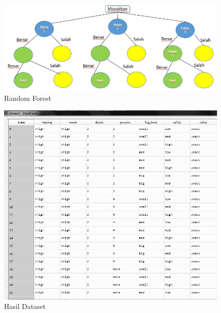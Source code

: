\begin{figure}
	\centerline{\includegraphics[width=1\textwidth]{figures/huda/chapter3/1.JPG}}
	\caption{Random Forest}
	\label{h1}
\end{figure}

\begin{figure}
	\centerline{\includegraphics[width=1\textwidth]{figures/huda/chapter3/2.PNG}}
	\caption{Hasil Dataset}
	\label{h2}
\end{figure}


